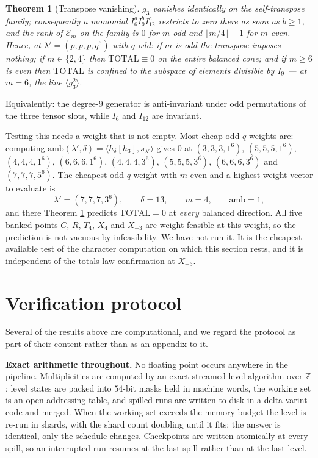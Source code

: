 \documentclass[11pt,reqno]{amsart}
\theoremstyle{plain}
\newtheorem{theorem}{Theorem}[section]
\theoremstyle{definition}
\newcommand{\bZ}{\mathbb{Z}}
\begin{document}
\begin{theorem}[Transpose vanishing]\label{thm:transvanish}
$g_3$ vanishes identically on the self-transpose family; consequently a monomial
$I_6^{a}I_9^{b}I_{12}^{c}$ restricts to zero there as soon as $b\ge1$, and the
rank of $\mathcal E_m$ on the family is $0$ for $m$ odd and
$\lfloor m/4\rfloor+1$ for $m$ even.  Hence, at $\lambda'=(p,p,p,q^{6})$ with $q$
odd: if $m$ is odd the transpose imposes nothing; if $m\in\{2,4\}$ then
$\mathrm{TOTAL}\equiv0$ on the entire balanced cone; and if $m\ge6$ is even then
$\mathrm{TOTAL}$ is confined to the subspace of elements divisible by $I_9$ ---
at $m=6$, the line $\langle g_3^{2}\rangle$.
\end{theorem}

Equivalently: the degree-$9$ generator is anti-invariant under odd permutations
of the three tensor slots, while $I_6$ and $I_{12}$ are invariant.

Testing this needs a weight that is not empty.  Most cheap odd-$q$ weights are:
computing $\mathrm{amb}(\lambda',\delta)=\langle h_\delta[h_3],s_{\lambda'}
\rangle$ gives $0$ at $(3,3,3,1^{6})$, $(5,5,5,1^{6})$, $(4,4,4,1^{6})$,
$(6,6,6,1^{6})$, $(4,4,4,3^{6})$, $(5,5,5,3^{6})$, $(6,6,6,3^{6})$ and
$(7,7,7,5^{6})$.  The cheapest odd-$q$ weight with $m$ even and a highest weight
vector to evaluate is
\[
  \lambda'=(7,7,7,3^{6}),\qquad \delta=13,\qquad m=4,\qquad \mathrm{amb}=1 ,
\]
and there Theorem \ref{thm:transvanish} predicts $\mathrm{TOTAL}=0$ at
\emph{every} balanced direction.  All five banked points $C$, $R$, $T_4$, $X_4$
and $X_{-3}$ are weight-feasible at this weight, so the prediction is not vacuous
by infeasibility.  We have not run it.  It is the cheapest available test of the
character computation on which this section rests, and it is independent of the
totals-law confirmation at $X_{-3}$.

\section{Verification protocol}\label{sec:method}

Several of the results above are computational, and we regard the protocol as
part of their content rather than as an appendix to it.

\smallskip
\noindent\textbf{Exact arithmetic throughout.}  No floating point occurs
anywhere in the pipeline.  Multiplicities are computed by an exact streamed
level algorithm over $\bZ$: level states are packed into $54$-bit masks held in
machine words, the working set is an open-addressing table, and spilled runs
are written to disk in a delta-varint code and merged.  When the working set
exceeds the memory budget the level is re-run in shards, with the shard count
doubling until it fits; the answer is identical, only the schedule changes.
Checkpoints are written atomically at every spill, so an interrupted run
resumes at the last spill rather than at the last level.
\end{document}
